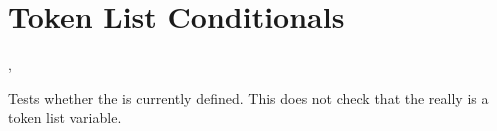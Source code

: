 \documentclass[oneside]{book}
\begin{document}
%

\section{Token List Conditionals}

\begin{function}{\TlIfExist,\TlIfExistTF}
\begin{syntax}
 
   
\end{syntax}
Tests whether the  is currently defined.  This does not
check that the  really is a token list variable.
\begin{demohigh}
\TlIfExistTF {} {}
\TlIfExistTF {} {}
\end{demohigh}
\end{function}
\end{document}
